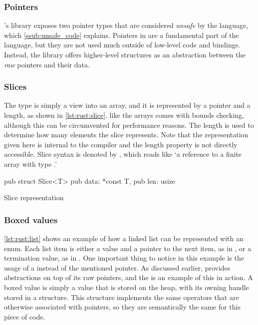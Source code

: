 \subsubsection{Pointers}

\rust's {\core} library exposes two pointer types that are considered \emph{unsafe} by the language, which \autoref{ssub:unsafe_code} explains.
Pointers in {\rust} are a fundamental part of the language, but they are not used much outside of low-level code and bindings.
Instead, the library offers higher-level structures as an abstraction between the \emph{raw} pointers and their data.

\subsubsection{Slices}

The  type is simply a view into an array, and it is represented by a pointer and a length, as shown in \autoref{lst:rust:slice}.
 like the arrays comes with bounds checking, although this can be circumvented for performance reasons.
The length is used to determine how many elements the slice represents.
Note that the representation given here is internal to the compiler and the length property is not directly accessible.
Slice syntax is denoted by \code{\&[T]}, which reads like `a reference to a finite array with type .'

\begin{listing}[H]
  \begin{rustcode}
pub struct Slice<T> {
  pub data: *const T,
  pub len: usize
}
\end{rustcode}
\caption{Slice representation}
\label{lst:rust:slice}
\end{listing}

\subsubsection{Boxed values}

\autoref{lst:rust:list} shows an example of how a linked list can be represented with an enum.
Each list item is either a value and a pointer to the next item, as in , or a termination value, as in .
One important thing to notice in this example is the usage of a  instead of the mentioned pointer.
As discussed earlier, {\rust} provides abstractions on top of its raw pointers, and the  is an example of this in action.
A boxed value is simply a value that is stored on the heap, with its owning handle stored in a  structure.
This structure implements the same operators that are otherwise associated with pointers, so they are semantically the same for this piece of code.

